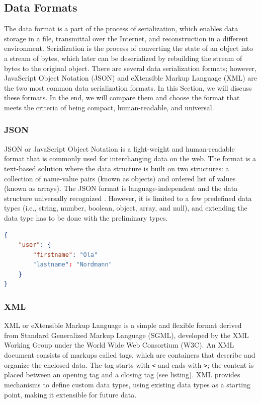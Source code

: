 \subsection{Data Formats} \label{sec:dataformat}

The data format is a part of the process of serialization, which enables data storage in a file, transmittal over the Internet, and reconstruction in a different environment. Serialization is the process of converting the state of an object into a stream of bytes, which later can be deserialized by rebuilding the stream of bytes to the original object. There are several data serialization formats; however, JavaScript Object Notation (JSON) and eXtensible Markup Language (XML) are the two most common data serialization formats. In this Section, we will discuss these formats. In the end, we will compare them and choose the format that meets the criteria of being compact, human-readable, and universal. 

\subsubsection{JSON}
JSON or JavaScript Object Notation is a light-weight and human-readable format that is commonly used for interchanging data on the web. The format is a text-based solution where the data structure is built on two structures: a collection of name-value pairs (known as objects) and ordered list of values (known as arrays). The JSON format is language-independent and the data structure universally recognized \cite{jsonorg, jsonvxml}. However, it is limited to a few predefined data types (i.e., string, number, boolean, object, array, and null), and extending the data type has to be done with the preliminary types. 

\begin{lstlisting}[language=json, caption={My Caption}, captionpos=b]
{
    "user": {
        "firstname": "Ola"
        "lastname": "Nordmann"
    }
}
\end{lstlisting}

\subsubsection{XML}
XML or eXtensible Markup Language is a simple and flexible format derived from Standard Generalized Markup Language (SGML), developed by the XML Working Group under the World Wide Web Consortium (W3C). An XML document consists of markups called tags, which are containers that describe and organize the enclosed data. The tag starts with \verb|<| and ends with \verb|>|; the content is placed between an opening tag and a closing tag (see listing). \cite{w3xml, jsonvxml} XML provides mechanisms to define custom data types, using existing data types as a starting point, making it extensible for future data. 

